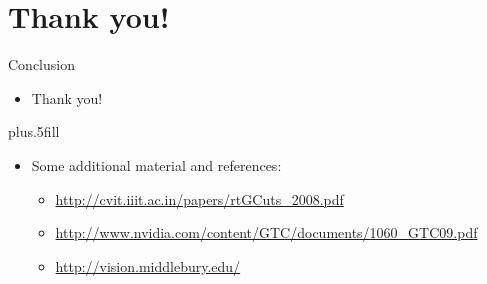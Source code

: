 \documentclass{beamer}
\begin{document}
\section*{Thank you!}

\begin{frame}{Conclusion}

  \begin{itemize}
  \item
    \alert{Thank you!}
  \end{itemize}
  
  \vskip0pt plus.5fill
  \begin{itemize}
  \item
    Some additional material and references:
    \begin{itemize}
    \item
      \url{http://cvit.iiit.ac.in/papers/rtGCuts_2008.pdf}
    \item
      \url{http://www.nvidia.com/content/GTC/documents/1060_GTC09.pdf}
    \item
      \url{http://vision.middlebury.edu/}
    \end{itemize}
  \end{itemize}
\end{frame}
\end{document}

